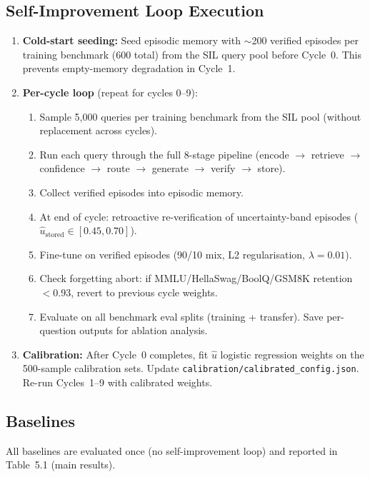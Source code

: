 \documentclass[12pt,a4paper]{article}
\newcommand{\uhat}{\hat{u}}
\newcommand{\ustored}{\hat{u}_{\text{stored}}}
\begin{document}
\subsection{Self-Improvement Loop Execution}

\begin{enumerate}
  \item \textbf{Cold-start seeding:} Seed episodic memory with $\sim$200 verified
        episodes per training benchmark (600 total) from the SIL query pool
        before Cycle~0.
        This prevents empty-memory degradation in Cycle~1.
  \item \textbf{Per-cycle loop} (repeat for cycles 0--9):
    \begin{enumerate}[label=\alph*.]
      \item Sample 5,000 queries per training benchmark from the SIL pool
            (without replacement across cycles).
      \item Run each query through the full 8-stage pipeline
            (encode $\to$ retrieve $\to$ confidence $\to$ route $\to$ generate
            $\to$ verify $\to$ store).
      \item Collect verified episodes into episodic memory.
      \item At end of cycle: retroactive re-verification of uncertainty-band
            episodes ($\ustored \in [0.45, 0.70]$).
      \item Fine-tune on verified episodes (90/10 mix, L2 regularisation,
            $\lambda = 0.01$).
      \item Check forgetting abort: if MMLU/HellaSwag/BoolQ/GSM8K retention
            $< 0.93$, revert to previous cycle weights.
      \item Evaluate on all benchmark eval splits (training + transfer).
            Save per-question outputs for ablation analysis.
    \end{enumerate}
  \item \textbf{Calibration:} After Cycle~0 completes, fit $\uhat$ logistic
        regression weights on the 500-sample calibration sets.
        Update \texttt{calibration/calibrated\_config.json}.
        Re-run Cycles~1--9 with calibrated weights.
\end{enumerate}

\subsection{Baselines}

All baselines are evaluated once (no self-improvement loop) and reported in
Table~5.1 (main results).
\end{document}
